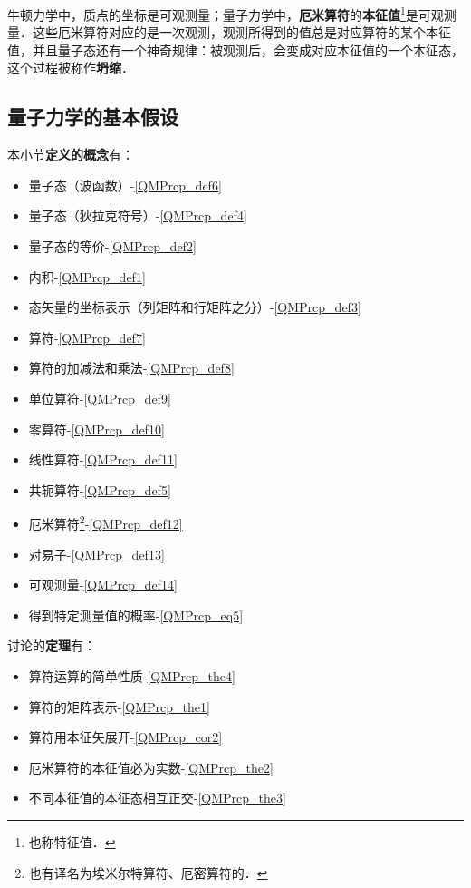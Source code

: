 牛顿力学中，质点的坐标是可观测量；量子力学中，\textbf{厄米算符}的\textbf{本征值}\footnote{也称特征值．}是可观测量．这些厄米算符对应的是一次观测，观测所得到的值总是对应算符的某个本征值，并且量子态还有一个神奇规律：被观测后，会变成对应本征值的一个本征态，这个过程被称作\textbf{坍缩}．



\subsection{量子力学的基本假设}

本小节\textbf{定义的概念}有：

\begin{itemize}
\item 量子态（波函数）-\autoref{QMPrcp_def6} 
\item 量子态（狄拉克符号）-\autoref{QMPrcp_def4} 
\item 量子态的等价-\autoref{QMPrcp_def2} 
\item 内积-\autoref{QMPrcp_def1} 
\item 态矢量的坐标表示（列矩阵和行矩阵之分）-\autoref{QMPrcp_def3} 
\item 算符-\autoref{QMPrcp_def7} 
\item 算符的加减法和乘法-\autoref{QMPrcp_def8} 
\item 单位算符-\autoref{QMPrcp_def9} 
\item 零算符-\autoref{QMPrcp_def10} 
\item 线性算符-\autoref{QMPrcp_def11} 
\item 共轭算符-\autoref{QMPrcp_def5} 
\item 厄米算符\footnote{也有译名为埃米尔特算符、厄密算符的．}-\autoref{QMPrcp_def12} 
\item 对易子-\autoref{QMPrcp_def13} 
\item 可观测量-\autoref{QMPrcp_def14} 
\item 得到特定测量值的概率-\autoref{QMPrcp_eq5} 
\end{itemize}


讨论的\textbf{定理}有：

\begin{itemize}
\item 算符运算的简单性质-\autoref{QMPrcp_the4} 
\item 算符的矩阵表示-\autoref{QMPrcp_the1} 
\item 算符用本征矢展开-\autoref{QMPrcp_cor2} 
\item 厄米算符的本征值必为实数-\autoref{QMPrcp_the2} 
\item 不同本征值的本征态相互正交-\autoref{QMPrcp_the3} 
\end{itemize}

